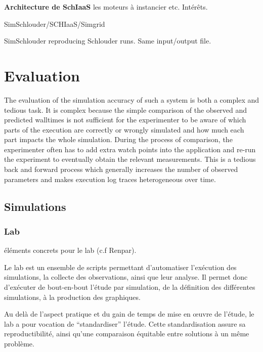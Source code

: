 \textbf{Architecture de SchIaaS} les moteurs à instancier etc. Intérêts.


SimSchlouder/SCHIaaS/Simgrid

SimSchlouder reproducing Schlouder runs. Same input/output file.






\section{Evaluation}

The evaluation of the simulation accuracy of such a system is both a complex and
tedious task.  It  is complex because the simple comparison  of the observed and
predicted walltimes is not sufficient for  the experimenter to be aware of which
parts of the execution are correctly or wrongly simulated and how much each part
impacts the whole simulation. During the process of comparison, the experimenter
often  has  to add  extra  watch  points into  the  application  and re-run  the
experiment to  eventually obtain the  relevant measurements.  This is  a tedious
back  and forward  process  which  generally increases  the  number of  observed
parameters and makes execution log traces heterogeneous over time.


\subsection{Simulations}

\subsubsection{Lab}

éléments concrets pour le lab (c.f Renpar).

Le  lab est  un ensemble  de  scripts permettant  d'automatiser l'exécution  des
simulations, la  collecte des  observations, ainsi que  leur analyse.  Il permet
donc d'exécuter  de bout-en-bout  l'étude par simulation,  de la  définition des
différentes simulations, à la production des graphiques.

Au delà de l'aspect pratique et du gain de temps de mise en œuvre de l'étude, le
lab a pour vocation de ``standardiser'' l'étude. Cette standardisation assure sa
reproductibilité, ainsi qu'une  comparaison équitable entre solutions  à un même
problème.


